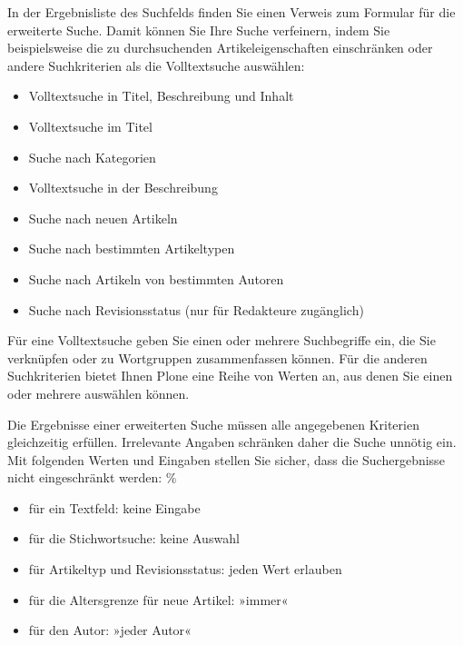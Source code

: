 \documentclass[a4paper,12pt,ngerman]{manual}
\begin{document}
In der Ergebnisliste des Suchfelds finden Sie einen Verweis zum
Formular für die erweiterte Suche. Damit können Sie Ihre Suche
verfeinern, indem Sie beispielsweise die zu durchsuchenden
Artikeleigenschaften einschränken oder andere Suchkriterien als die
Volltextsuche auswählen:
\begin{itemize}
\item {} 
Volltextsuche in Titel, Beschreibung und Inhalt

\item {} 
Volltextsuche im Titel

\item {} 
Suche nach Kategorien

\item {} 
Volltextsuche in der Beschreibung

\item {} 
Suche nach neuen Artikeln

\item {} 
Suche nach bestimmten Artikeltypen

\item {} 
Suche nach Artikeln von bestimmten Autoren

\item {} 
Suche nach Revisionsstatus (nur für Redakteure zugänglich)

\end{itemize}

Für eine Volltextsuche geben Sie einen oder mehrere Suchbegriffe ein,
die Sie verknüpfen oder zu Wortgruppen zusammenfassen können. Für die
anderen Suchkriterien bietet Ihnen Plone eine Reihe von Werten an, aus
denen Sie einen oder mehrere auswählen können.

Die Ergebnisse einer erweiterten Suche müssen alle angegebenen
Kriterien gleichzeitig erfüllen. Irrelevante Angaben schränken daher
die Suche unnötig ein. Mit folgenden Werten und Eingaben stellen Sie
sicher, dass die Suchergebnisse nicht eingeschränkt werden: \%
\begin{itemize}
\item {} 
für ein Textfeld: keine Eingabe

\item {} 
für die Stichwortsuche: keine Auswahl

\item {} 
für Artikeltyp und Revisionsstatus: jeden Wert erlauben

\item {} 
für die Altersgrenze für neue Artikel: »immer«

\item {} 
für den Autor: »jeder Autor«

\end{itemize}
\hypertarget{sec-suchportlet}{}
\end{document}
